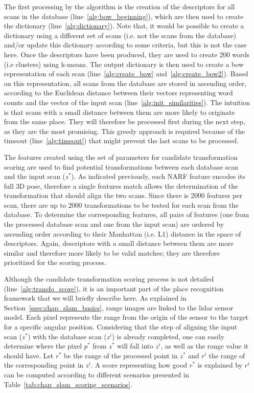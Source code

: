The first processing by the algorithm is the creation of the descriptors for all scans in the database (line~\ref{alg:bow_beginning}), which are then used to create the dictionary (line~\ref{alg:dictionary}). Note that, it would be possible to create a dictionary using a different set of scans (i.e. not the scans from the database) and/or update this dictionary according to some criteria, but this is not the case here. Once the descriptors have been produced, they are used to create 200 words (i.e clusters) using k-means. The output dictionary is then used to create a \gls*{bow} representation of each scan (line~\ref{alg:create_bow} and~\ref{alg:create_bow2}). Based on this representation, all scans from the database are stored in ascending order, according to the Euclidean distance between their vectors representing word counts and the vector of the input scan (line~\ref{alg:init_similarities}). The intuition is that scans with a small distance between them are more likely to originate from the same place. They will therefore be processed first during the next step, as they are the most promising. This greedy approach is required because of the timeout (line~\ref{alg:timeout}) that might prevent the last scans to be processed.

The features created using the set of parameters for candidate transformation scoring are used to find potential transformations between each database scan and the input scan ($z^*$). As indicated previously, each NARF feature encodes its full 3D pose, therefore a single features match allows the determination of the transformation that should align the two scans. Since there is 2000 features per scan, there are up to 2000 transformations to be tested for each scan from the database. To determine the corresponding features, all pairs of features (one from the processed database scan and one from the input scan) are ordered by ascending order according to their Manhattan (i.e. L1) distance in the space of descriptors. Again, descriptors with a small distance between them are more similar and therefore more likely to be valid matches; they are therefore prioritized for the scoring process.

Although the candidate transformation scoring process is not detailed (line~\ref{alg:transfo_score}), it is an important part of the place recognition framework that we will briefly describe here. As explained in Section~\ref{ssec:chap_slam_basics}, range images are linked to the \gls*{lidar} sensor model. Each pixel represents the range from the origin of the sensor to the target for a specific angular position. Considering that the step of aligning the input scan ($z^*$) with the database scan ($z^i$) is already completed, one can easily determine where the pixel $p^*$ from $z^*$ will fall into $z^i$, as well as the range value it should have. Let $r^*$ be the range of the processed point in $z^*$ and $r^i$ the range of the corresponding point in $z^i$. A score representing how good $r^*$ is explained by $r^i$ can be computed according to different scenarios presented in Table~\ref{tab:chap_slam_scoring_scenarios}.

